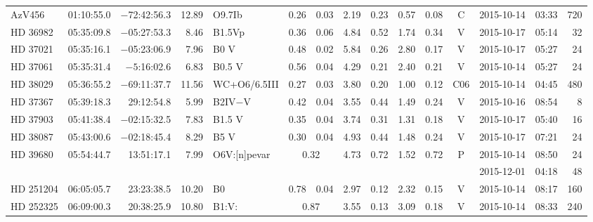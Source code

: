 \begin{tiny}
\begin{longtable}{lrrrll@{$\,\pm$\,}rl@{$\,\pm$\,}rl@{$\,\pm$\,}rcrrr}
AzV456        &01:10:55.0&  $-$72:42:56.3&       12.89&  O9.7Ib         & 0.26 & 0.03   &    2.19 & 0.23 &      0.57 & 0.08 &    C  &2015-10-14 &03:33&  720\\  %
HD 36982      &05:35:09.8&  $-$05:27:53.3&        8.46&  B1.5Vp         & 0.36 & 0.06   &    4.84 & 0.52 &      1.74 & 0.34 &    V  &2015-10-17 &05:14&   32\\  %
HD 37021      &05:35:16.1&  $-$05:23:06.9&        7.96&  B0 V           & 0.48 & 0.02   &    5.84 & 0.26 &      2.80 & 0.17 &    V  &2015-10-17 &05:27&   24\\  %
HD 37061      &05:35:31.4&   $-5$:16:02.6&        6.83&  B0.5 V         & 0.56 & 0.04   &    4.29 & 0.21 &      2.40 & 0.21 &    V  &2015-10-14 &05:27&   24\\  %
HD 38029      &05:36:55.2&  $-$69:11:37.7&       11.56&  WC+O6/6.5III   & 0.27 & 0.03   &    3.80 & 0.20 &      1.00 & 0.12 &  C06  &2015-10-14 &04:45&  480\\  %
HD 37367      &05:39:18.3&     29:12:54.8&        5.99&  B2IV$-$V       & 0.42 & 0.04   &    3.55 & 0.44 &      1.49 & 0.24 &    V  &2015-10-16 &08:54&    8\\  %
HD 37903      &05:41:38.4&  $-$02:15:32.5&        7.83&  B1.5 V         & 0.35 & 0.04   &    3.74 & 0.31 &      1.31 & 0.18 &    V  &2015-10-17 &05:40&   16\\  %
HD 38087      &05:43:00.6&  $-$02:18:45.4&        8.29&  B5 V           & 0.30 & 0.04   &    4.93 & 0.44 &      1.48 & 0.24 &    V  &2015-10-17 &07:21&   24\\  %
HD 39680      &05:54:44.7&     13:51:17.1&        7.99&  O6V:[n]pevar &\multicolumn{2}{c}{0.32}&4.73& 0.72&     1.52 & 0.72 &    P  &2015-10-14 &08:50&   24\\  %
              &          &               &            &                 & \multicolumn{6}{c}{}                              &       &2015-12-01 &04:18&   48\\  %
HD 251204     &06:05:05.7&     23:23:38.5&       10.20&  B0             & 0.78 & 0.04   &    2.97 & 0.12 &      2.32 & 0.15 &    V  &2015-10-14 &08:17&  160\\  %
HD 252325     &06:09:00.3&     20:38:25.9&       10.80&  B1:V: &\multicolumn{2}{c}{0.87}&    3.55 & 0.13 &      3.09 & 0.18 &    V  &2015-10-14 &08:33&  240\\  %

\end{longtable}
\end{tiny}
